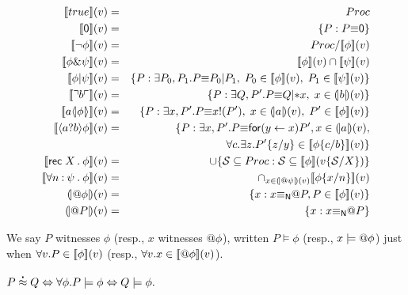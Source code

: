 \begin{eqnarray}
  \pmeaningof{\ptrue}(v) & = & \Proc \nonumber \\ 
  \pmeaningof{\pzero}(v) & = & \{ P : P \scong \pzero \} \nonumber \\ 
  \pmeaningof{\neg \phi}(v) & = & \Proc / \pmeaningof{\phi}(v) \nonumber\\
  \pmeaningof{\phi \& \psi}(v) & = & \pmeaningof{\phi}(v) \cap \pmeaningof{\psi}(v) \nonumber\\
  \pmeaningof{\binpar{\phi}{\psi}}(v) & = &
  \{ P : \exists P_0, P_1.P \scong \binpar{P_0}{P_1}, \; P_0 \in \pmeaningof{\phi}(v), \;  P_1 \in \pmeaningof{\psi}(v) \} \nonumber\\
  \pmeaningof{\pdropf{b}}(v) & = & \{ P : \exists Q, P'.P \scong \binpar{Q}{\dropn{x}}, \; x \in \nmeaningof{b}(v) \} \nonumber\\	
  \pmeaningof{\plift{a}{\phi}}(v) & = & \{ P : \exists x, P'.P \scong \lift{x}{P'},
                                           \; x \in \nmeaningof{a}(v), 
                                           \; P' \in \pmeaningof{\phi}(v) \} \nonumber\\
  \pmeaningof{\pprefix{a}{b}{\phi}}(v) & = & \{ P : \exists x, P'.P \scong \prefix{x}{y}{P'}, x \in \nmeaningof{a}(v), \nonumber\\
                                   &   &            \; \; \; \forall c . \exists z . {P'}\substn{z}{y} \in \pmeaningof{{\phi}\substn{c}{b}}(v) \} \nonumber\\
  \pmeaningof{\pgfp{X}{\phi}}(v) & = & \cup \{ \mathcal{S} \subseteq \Proc : \mathcal{S} \subseteq \pmeaningof{\phi}(v\substn{\mathcal{S}}{X})\} \nonumber\\
  \pmeaningof{\pquant{n}{\psi}{\phi}}(v) & = & \cap_{x \in \nmeaningof{\quotep{\psi}}(v)} \pmeaningof{{\phi}\substn{x}{n}}(v) \nonumber\\
  \nmeaningof{\quotep{\phi}}(v) & = & \{ x : x \nameeq \quotep{P}, P \in \pmeaningof{\phi}(v) \} \nonumber\\
  \nmeaningof{\quotep{P}}(v) & = & \{ x : x \nameeq  \quotep{P} \} \nonumber
\end{eqnarray}

We say $P$ witnesses $\phi$ (resp., $x$ witnesses $\mathsf{@} \phi$),
written $P \models \phi$ (resp., $x \models \mathsf{@} \phi$) just when
$\forall v . P \in [\![ \phi ]\!](v)$ (resp., $\forall v . x \in [\![ \mathsf{@} \phi ]\!](v)$).

\begin{theorem}[Equivalence]
	$P \stackrel{\centerdot}{\approx} Q \Leftrightarrow \forall \phi . P \models \phi \Leftrightarrow Q \models \phi .$
\end{theorem}

